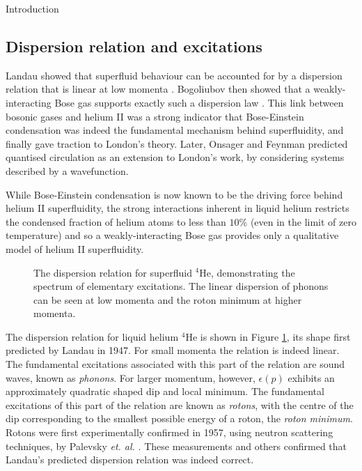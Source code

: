 \begin{chapter}{\label{cha:bose_gases}Introduction}
\subsection{Dispersion relation and excitations}
Landau showed that superfluid behaviour can be accounted for by a dispersion relation that is linear at low momenta \cite{Landau41}. Bogoliubov then showed that a weakly-interacting Bose gas supports exactly such a dispersion law \cite{bogo47}. This link between bosonic gases and helium II was a strong indicator that Bose-Einstein condensation was indeed the fundamental mechanism behind superfluidity, and finally gave traction to London's theory. Later, Onsager \cite{Onsager49} and Feynman \cite{Feynman55} predicted quantised circulation as an extension to London's work, by considering systems described by a wavefunction.

While Bose-Einstein condensation is now known to be the driving force behind helium II superfluidity, the strong interactions inherent in liquid helium restricts the condensed fraction of helium atoms to less than $10\%$ \cite{Donnelly} (even in the limit of zero temperature) and so a weakly-interacting Bose gas provides only a qualitative model of helium II superfluidity.

\begin{figure}
	\centering
	\caption{\label{fig:hedisp}The dispersion relation for superfluid $^4$He, demonstrating the spectrum of elementary excitations. The linear dispersion of phonons can be seen at low momenta and the roton minimum at higher momenta.}
\end{figure}

The dispersion relation for liquid helium $^4$He is shown in Figure \ref{fig:hedisp}, its shape first predicted by Landau \cite{Landau47} in 1947. For small momenta the relation is indeed linear. The fundamental excitations associated with this part of the relation are sound waves, known as {\it phonons}. For larger momentum, however, $\epsilon(p)$ exhibits an approximately quadratic shaped dip and local minimum. The fundamental excitations of this part of the relation are known as {\it rotons}, with the centre of the dip corresponding to the smallest possible energy of a roton, the {\it roton minimum}. Rotons were first experimentally confirmed in 1957, using neutron scattering techniques, by Palevsky {\it et. al.} \cite{PhysRev.108.1346}. These measurements and others \cite{PhysRevLett.1.9,PhysRevLett.1.127,PhysRev.112.11} confirmed that Landau's predicted dispersion relation was indeed correct.


\end{chapter}
